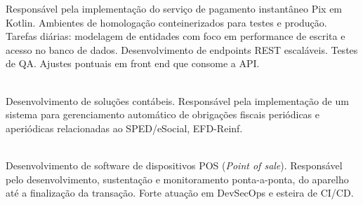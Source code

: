 \documentclass[10pt,a4paper,ragged2e]{altacv}
\begin{document}
\divider

Responsável pela implementação do serviço de pagamento instantâneo Pix em Kotlin. Ambientes de homologação conteinerizados para testes e produção. Tarefas diárias: modelagem de entidades com foco em performance de escrita e acesso no banco de dados. Desenvolvimento de endpoints REST escaláveis. Testes de QA. Ajustes pontuais em front end que consome a API.
\\

\newline
{}
\\

\divider


Desenvolvimento de soluções contábeis. Responsável pela implementação de um sistema para gerenciamento automático de obrigações fiscais periódicas e aperiódicas relacionadas ao SPED/eSocial, EFD-Reinf.
\\

\\

\divider


Desenvolvimento de software de dispositivos POS (\textit{Point of sale}). Responsável pelo desenvolvimento, sustentação e monitoramento ponta-a-ponta, do aparelho até a finalização da transação. Forte atuação em DevSecOps e esteira de CI/CD. 
\\

\\

\clearpage

\end{document}
